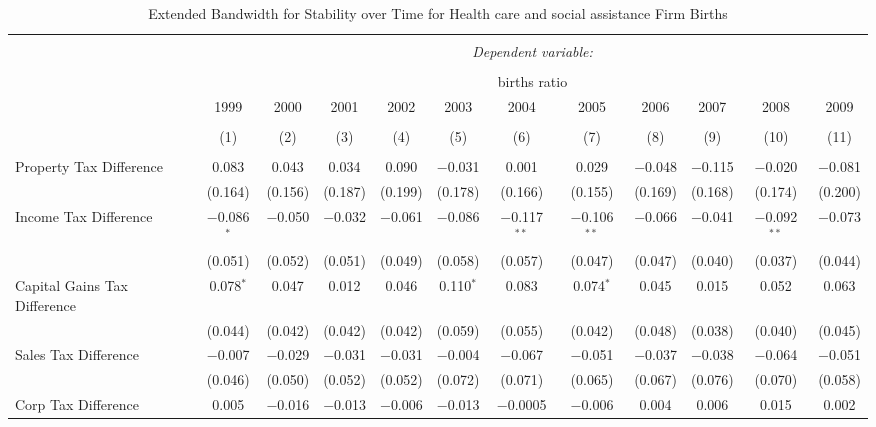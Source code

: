 
\begin{table}[!htbp] \centering 
  \caption{Extended Bandwidth for Stability over Time for  Health care and social assistance Firm Births} 
  \label{} 
\begin{tabular}{@{\extracolsep{5pt}}lccccccccccc} 
\\[-1.8ex]\hline 
\hline \\[-1.8ex] 
 & \multicolumn{11}{c}{\textit{Dependent variable:}} \\ 
\cline{2-12} 
\\[-1.8ex] & \multicolumn{11}{c}{births ratio} \\ 
 & 1999 & 2000 & 2001 & 2002 & 2003 & 2004 & 2005 & 2006 & 2007 & 2008 & 2009 \\ 
\\[-1.8ex] & (1) & (2) & (3) & (4) & (5) & (6) & (7) & (8) & (9) & (10) & (11)\\ 
\hline \\[-1.8ex] 
 Property Tax Difference & 0.083 & 0.043 & 0.034 & 0.090 & $-$0.031 & 0.001 & 0.029 & $-$0.048 & $-$0.115 & $-$0.020 & $-$0.081 \\ 
  & (0.164) & (0.156) & (0.187) & (0.199) & (0.178) & (0.166) & (0.155) & (0.169) & (0.168) & (0.174) & (0.200) \\ 
  Income Tax Difference & $-$0.086$^{*}$ & $-$0.050 & $-$0.032 & $-$0.061 & $-$0.086 & $-$0.117$^{**}$ & $-$0.106$^{**}$ & $-$0.066 & $-$0.041 & $-$0.092$^{**}$ & $-$0.073 \\ 
  & (0.051) & (0.052) & (0.051) & (0.049) & (0.058) & (0.057) & (0.047) & (0.047) & (0.040) & (0.037) & (0.044) \\ 
  Capital Gains Tax Difference & 0.078$^{*}$ & 0.047 & 0.012 & 0.046 & 0.110$^{*}$ & 0.083 & 0.074$^{*}$ & 0.045 & 0.015 & 0.052 & 0.063 \\ 
  & (0.044) & (0.042) & (0.042) & (0.042) & (0.059) & (0.055) & (0.042) & (0.048) & (0.038) & (0.040) & (0.045) \\ 
  Sales Tax Difference & $-$0.007 & $-$0.029 & $-$0.031 & $-$0.031 & $-$0.004 & $-$0.067 & $-$0.051 & $-$0.037 & $-$0.038 & $-$0.064 & $-$0.051 \\ 
  & (0.046) & (0.050) & (0.052) & (0.052) & (0.072) & (0.071) & (0.065) & (0.067) & (0.076) & (0.070) & (0.058) \\ 
  Corp Tax Difference & 0.005 & $-$0.016 & $-$0.013 & $-$0.006 & $-$0.013 & $-$0.0005 & $-$0.006 & 0.004 & 0.006 & 0.015 & 0.002 \\ 

\end{tabular}
\end{table}
